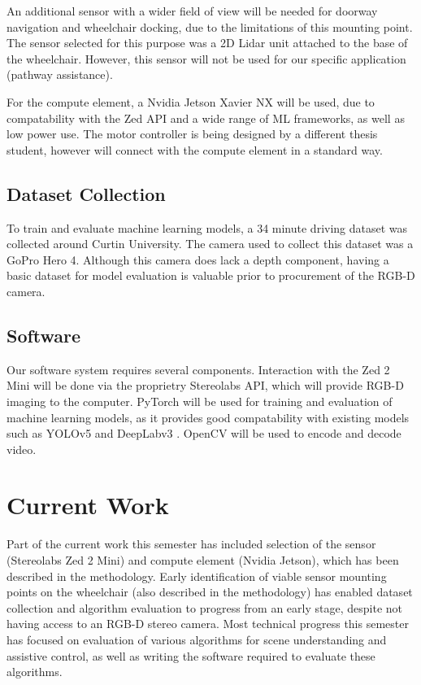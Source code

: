 \documentclass[12pt]{article}
\begin{document}
An additional sensor with a wider field of view will be needed for doorway navigation
and wheelchair docking, due to the limitations of this mounting point. The sensor selected for this purpose
was a 2D Lidar unit attached to the base of the wheelchair. However, this sensor will not be used for
our specific application (pathway assistance).

For the compute element, a Nvidia Jetson Xavier NX will be used, due to compatability with the Zed API
and a wide range of ML frameworks, as well as low power use.
The motor controller is being designed by a different thesis student, however will connect with the compute element in a standard way.

\subsection{Dataset Collection}
To train and evaluate machine learning models, a 34 minute driving dataset was collected around Curtin University.
The camera used to collect this dataset was a GoPro Hero 4. Although this camera does lack a depth component,
having a basic dataset for model evaluation is valuable prior to procurement of the RGB-D camera.

\subsection{Software}
Our software system requires several components. Interaction with the Zed 2 Mini will be done
via the proprietry Stereolabs API, which will provide RGB-D imaging to the computer.
PyTorch \cite{paszkePyTorchImperativeStyle2019} will be used for training and evaluation of machine learning models, as it
provides good compatability with existing models such as YOLOv5 \cite{ultralyticsYOLOv5}
and DeepLabv3 \cite{chenRethinkingAtrousConvolution2017}. OpenCV \cite{bradskiOpenCVLibrary2000} will be used to encode and decode video.
\pagebreak





\section{Current Work}
Part of the current work this semester has included selection of the sensor (Stereolabs Zed 2 Mini) and compute element (Nvidia Jetson),
which has been described in the methodology.
Early identification of viable sensor mounting points on the wheelchair (also described in the methodology) has enabled dataset collection
and algorithm evaluation to progress from an early stage, despite not having access to an RGB-D stereo camera.
Most technical progress this semester has focused on evaluation of various algorithms for scene understanding
and assistive control, as well as writing the software required to evaluate these algorithms.
\end{document}
